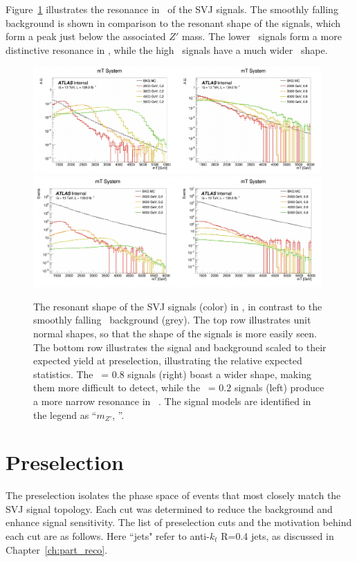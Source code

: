 Figure~\ref{fig:mt_mass} illustrates the resonance in \mt~of the SVJ signals. The smoothly falling background is shown in comparison to the resonant shape of the signals, which form a peak just below the associated $Z'$ mass. The lower \rinv~signals form a more distinctive resonance in \mt, while the high \rinv~signals have a much wider \mt~shape.
\begin{figure}[!htbp]
\centering
    \includegraphics[width=0.98\textwidth]{figures/ch8/mt_mass_norm}
    \includegraphics[width=0.98\textwidth]{figures/ch8/mt_mass_unnorm}
    \caption{The resonant shape of the SVJ signals (color) in \mt, in contrast to the smoothly falling \mt~background (grey). The top row illustrates unit normal shapes, so that the shape of the signals is more easily seen. The bottom row illustrates the signal and background scaled to their expected yield at preselection, illustrating the relative expected statistics. The \rinv~= 0.8 signals (right) boast a wider shape, making them more difficult to detect, while the \rinv~= 0.2 signals (left) produce a more narrow resonance in \mt~. The signal models are identified in the legend as ``$m_{Z'}$, \rinv''. 
    \label{fig:mt_mass}}
\end{figure}

\section{Preselection}
\label{sec:eventsel}

The preselection isolates the phase space of events that most closely match the SVJ signal topology. Each cut was determined to reduce the background and enhance signal sensitivity.
The list of preselection cuts and the motivation behind each cut are as follows. 
Here ``jets" refer to anti-$k_t$ R=0.4 jets, as discussed in Chapter~\ref{ch:part_reco}.

